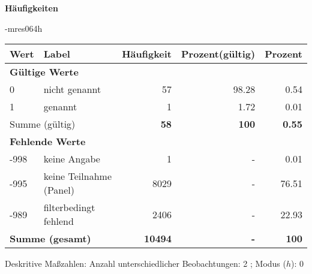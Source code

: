         		\vspace*{0.5cm}
                \noindent\textbf{Häufigkeiten}

                \vspace*{-\baselineskip}
					\begin{filecontents}{\jobname-mres064h}
					\begin{longtable}{lXrrr}
					\toprule
					\textbf{Wert} & \textbf{Label} & \textbf{Häufigkeit} & \textbf{Prozent(gültig)} & \textbf{Prozent} \\
					\endhead
					\midrule
					\multicolumn{5}{l}{\textbf{Gültige Werte}}\\

					0 &
					\multicolumn{1}{X}{ nicht genannt   } &


					  \num{57} &
					  \num[round-mode=places,round-precision=2]{98,28} &
					    \num[round-mode=places,round-precision=2]{0,54} \\

					1 &
					\multicolumn{1}{X}{ genannt   } &


					  \num{1} &
					  \num[round-mode=places,round-precision=2]{1,72} &
					    \num[round-mode=places,round-precision=2]{0,01} \\
					\midrule
					\multicolumn{2}{l}{Summe (gültig)} &
					  \textbf{\num{58}} &
					\textbf{100} &
					  \textbf{\num[round-mode=places,round-precision=2]{0,55}} \\
					\multicolumn{5}{l}{\textbf{Fehlende Werte}}\\
							-998 &
							keine Angabe &
							  \num{1} &
							 - &
							  \num[round-mode=places,round-precision=2]{0,01} \\
							-995 &
							keine Teilnahme (Panel) &
							  \num{8029} &
							 - &
							  \num[round-mode=places,round-precision=2]{76,51} \\
							-989 &
							filterbedingt fehlend &
							  \num{2406} &
							 - &
							  \num[round-mode=places,round-precision=2]{22,93} \\
					\midrule
					\multicolumn{2}{l}{\textbf{Summe (gesamt)}} &
				      \textbf{\num{10494}} &
				    \textbf{-} &
				    \textbf{100} \\
					\bottomrule
					\end{longtable}
					\end{filecontents}
				\label{tableValues:mres064h}
				\vspace*{-\baselineskip}
                    \begin{noten}
                	    \note{} Deskritive Maßzahlen:
                	    Anzahl unterschiedlicher Beobachtungen: 2%
                	    ; 
                	      Modus ($h$): 0
                     \end{noten}


